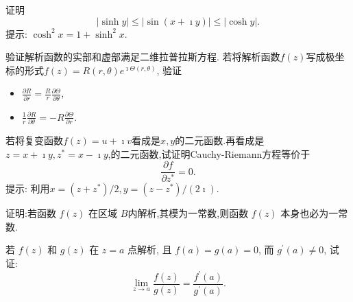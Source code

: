 \documentclass[10pt]{article}
\newenvironment{problem}[2][]{\begin{trivlist}
\item[\hskip \labelsep {\bfseries #1}\hskip \labelsep {\bfseries #2}]}{\end{trivlist}}
\begin{document}
\renewcommand{\labelenumi}{(\arabic{enumi})}
\renewcommand{\labelenumii}{(\arabic{enumi}.\arabic{enumii})}



 

\begin{problem}{1.1}
  证明
  $$
  |\sinh{y}| \leq |\sin(x+\imath y)| \leq |\cosh{y}|.
  $$
  提示: $\cosh^2{x} = 1+\sinh^2{x}$.
\end{problem}

  
\begin{problem}{1.2}
验证解析函数的实部和虚部满足二维拉普拉斯方程. 若将解析函数$f(z)$写成极坐标的形式$f(z) = R(r,\theta) e^{\imath \Theta(r,\theta)}$,
验证
\begin{itemize}
\item $\frac{\partial R}{\partial r}=\frac{R}{r} \frac{\partial \Theta}{\partial \theta}$,
\item $\frac{1}{r} \frac{\partial R}{\partial \theta}=-R \frac{\partial \Theta}{\partial r}$.
\end{itemize}

\end{problem}

\begin{problem}{1.3}
  若将复变函数$f(z)=u+\imath v$看成是$x,y$的二元函数.再看成是$z=x+\imath y, z^*= x-\imath y$,的二元函数,试证明Cauchy-Riemann方程等价于
  $$
  \frac{\partial f}{\partial z^{*}} = 0.
  $$ 
  提示: 利用$x=(z+z^*)/2, y=(z-z^*)/(2\imath)$.
\end{problem}



\begin{problem}{1.4}
  证明:若函数 $f ( z )$ 在区域 $B$内解析,其模为一常数,则函数 $f ( z )$ 本身也必为一常数.
\end{problem}

\begin{problem}{1.5}
  若 $f(z)$ 和 $g(z)$ 在 $z=a$ 点解析, 且 $f(a)=g(a)=0$, 而 $g^{\prime}(a) \neq 0$, 试证:
  $$
\lim _{z \rightarrow a} \frac{f(z)}{g(z)}=\frac{f^{\prime}(a)}{g^{\prime}(a)}.
$$
\end{problem}
\end{document}
